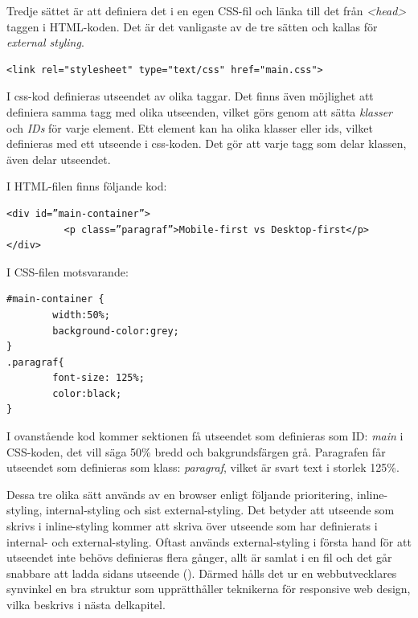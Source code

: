 \documentclass[11pt]{article}
\begin{document}
Tredje sättet är att definiera det i en egen CSS-fil och länka till det från \textit{<head>} taggen i HTML-koden. Det är det vanligaste av de tre sätten och kallas för \textit{external styling}.
\vspace{0.3cm}
\begin{verbatim}
<link rel="stylesheet" type="text/css" href="main.css">
\end{verbatim}
\vspace{0.3cm}

I css-kod definieras utseendet av olika taggar. Det finns även möjlighet att definiera samma tagg med olika utseenden, vilket görs genom att sätta \textit{klasser} och \textit{IDs} för varje element. Ett element kan ha olika klasser eller ids, vilket definieras med ett utseende i css-koden. Det gör att varje tagg som delar klassen, även delar utseendet.

\vspace{0.2cm}
I HTML-filen finns följande kod:

\begin{verbatim}
<div id=”main-container”>
          <p class=”paragraf”>Mobile-first vs Desktop-first</p>
</div>
\end{verbatim}
\vspace{0.2cm}
I CSS-filen motsvarande:

\begin{verbatim}
#main-container {
        width:50%;
        background-color:grey;
}
.paragraf{
        font-size: 125%;
        color:black;
}
\end{verbatim}
\vspace{0.5cm}

I ovanstående kod kommer sektionen få utseendet som definieras som ID: \textit{main} i CSS-koden, det vill säga 50\% bredd och bakgrundsfärgen grå. Paragrafen får utseendet som definieras som klass: \textit{paragraf}, vilket är svart text i storlek 125\%.

Dessa tre olika sätt används av en browser enligt följande prioritering, inline-styling, internal-styling och sist external-styling. Det betyder att utseende som skrivs i inline-styling kommer att skriva över utseende som har definierats i internal- och external-styling. Oftast används external-styling i första hand för att utseendet inte behövs definieras flera gånger, allt är samlat i en fil och det går snabbare att ladda sidans utseende (\cite{css}). Därmed hålls det ur en webbutvecklares synvinkel en bra struktur som upprätthåller teknikerna för responsive web design, vilka beskrivs i nästa delkapitel.
\end{document}
